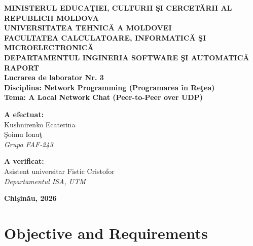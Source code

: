 \documentclass[11pt,a4paper]{article}
\begin{document}
\begin{titlepage}
    \centering
    \vspace*{0.5cm}
    {\Large \textbf{MINISTERUL EDUCA\c{T}IEI, CULTURII \c{S}I CERCET\u{A}RII AL REPUBLICII MOLDOVA}}\\[0.2cm]
    {\large \textbf{UNIVERSITATEA TEHNIC\u{A} A MOLDOVEI}}\\[0.2cm]
    {\large \textbf{FACULTATEA CALCULATOARE, INFORMATIC\u{A} \c{S}I MICROELECTRONIC\u{A}}}\\[0.2cm]
    {\large \textbf{DEPARTAMENTUL INGINERIA SOFTWARE \c{S}I AUTOMATIC\u{A}}}\\[2.5cm]

    {\Huge \textbf{RAPORT}}\\[0.4cm]
    {\LARGE \textbf{Lucrarea de laborator Nr. 3}}\\[0.3cm]
    {\Large \textbf{Disciplina: Network Programming (Programarea \^{i}n Re\c{t}ea)}}\\[0.5cm]
    {\Large \textbf{Tema: A Local Network Chat (Peer-to-Peer over UDP)}}\\[2.5cm]

    \begin{minipage}{0.45\textwidth}
        \flushleft
        \textbf{A efectuat:}\\
        Kushnirenko Ecaterina \\
        \c{S}oimu Ionu\c{t} \\
        \textit{Grupa FAF-243}
    \end{minipage}
    \hfill
    \begin{minipage}{0.45\textwidth}
        \flushright
        \textbf{A verificat:}\\
        Asistent universitar Fistic Cristofor\\
        \textit{Departamentul ISA, UTM}
    \end{minipage}

    \vfill
    {\large \textbf{Chi\c{s}in\u{a}u, 2026}}
\end{titlepage}

\newpage
\tableofcontents
\newpage

\section{Objective and Requirements}
\end{document}
